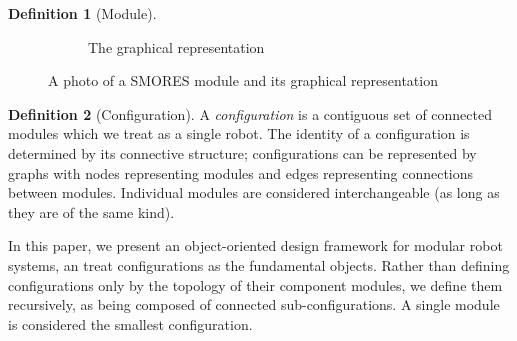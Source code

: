 \documentclass[conference]{IEEEtran}
\theoremstyle{definition}
\newtheorem{definition}{Definition}[section]
\begin{document}
\begin{definition}[Module]
\begin{figure}
\begin{center}
\begin{subfigure}[b]{0.4\columnwidth}
                \caption{The graphical representation}
                \label{fig:smores_graph}
        \end{subfigure}
\end{center}
\caption{A photo of a SMORES module and its graphical representation}
\label{fig:smores}
\end{figure}
\end{definition}

\begin{definition}[Configuration]
\label{def:configuration}
A \textit{configuration} is a contiguous set of connected modules which we treat as a
single robot.  The identity of a configuration is determined by its connective structure; configurations
can be represented by graphs with nodes representing modules and edges
representing connections between modules.   Individual modules
are considered interchangeable (as long as they are of the same kind).

In this paper, we present an object-oriented design framework for modular robot
systems, an treat configurations as the fundamental objects. Rather than defining
configurations only by the topology of their component modules, we define them recursively,
as being composed of connected sub-configurations. A single module is considered the
smallest configuration.


\end{definition}
\end{document}
